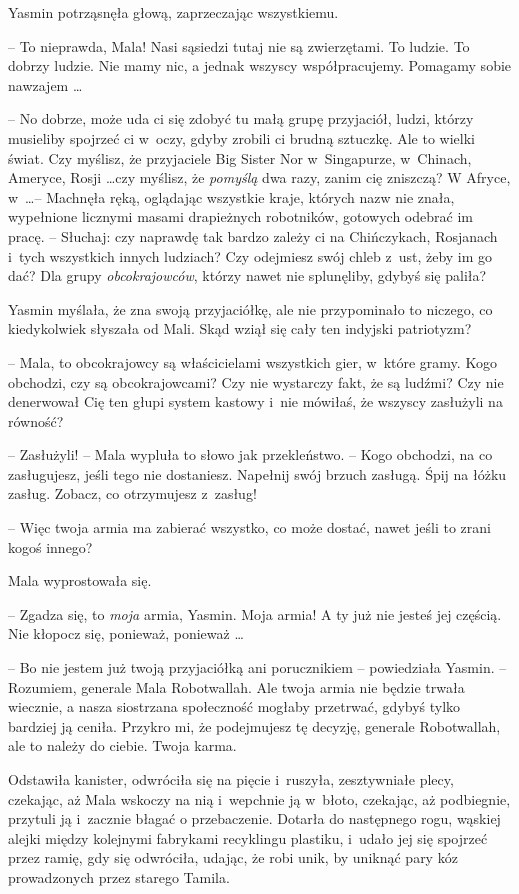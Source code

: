 \documentclass[oneside,polish,11pt,rmheadings]{mwbk}
\begin{document}
Yasmin potrząsnęła głową, zaprzeczając wszystkiemu. 

-- To nieprawda, Mala! Nasi sąsiedzi tutaj nie są zwierzętami. To ludzie. To dobrzy ludzie. Nie mamy nic, a jednak wszyscy współpracujemy. Pomagamy sobie nawzajem \ldots 

 -- No dobrze, może uda ci się zdobyć tu małą grupę przyjaciół, ludzi, którzy musieliby spojrzeć ci w~oczy, gdyby zrobili ci brudną sztuczkę. Ale to wielki świat. Czy myślisz, że przyjaciele Big Sister Nor w~Singapurze, w~Chinach, Ameryce, Rosji \ldots  czy myślisz, że \textit{pomyślą }dwa razy, zanim cię zniszczą? W Afryce, w~\ldots  -- Machnęła ręką, oglądając wszystkie kraje, których nazw nie znała, wypełnione licznymi masami drapieżnych robotników, gotowych odebrać im pracę. -- Słuchaj: czy naprawdę tak bardzo zależy ci na Chińczykach, Rosjanach i~tych wszystkich innych ludziach? Czy odejmiesz swój chleb z~ust, żeby im go dać? Dla grupy \textit{obcokrajowców}, którzy nawet nie splunęliby, gdybyś się paliła?

Yasmin myślała, że zna swoją przyjaciółkę, ale nie przypominało to niczego, co kiedykolwiek słyszała od Mali. Skąd wziął się cały ten indyjski patriotyzm? 

-- Mala, to obcokrajowcy są właścicielami wszystkich gier, w~które gramy. Kogo obchodzi, czy są obcokrajowcami? Czy nie wystarczy fakt, że są ludźmi? Czy nie denerwował Cię ten głupi system kastowy i~nie mówiłaś, że wszyscy zasłużyli na równość?

-- Zasłużyli! -- Mala wypluła to słowo jak przekleństwo. -- Kogo obchodzi, na co zasługujesz, jeśli tego nie dostaniesz. Napełnij swój brzuch zasługą. Śpij na łóżku zasług. Zobacz, co otrzymujesz z~zasług!

-- Więc twoja armia ma zabierać wszystko, co może dostać, nawet jeśli to zrani kogoś innego? 

Mala wyprostowała się. 

-- Zgadza się, to \textit{moja }armia, Yasmin. Moja armia! A ty już nie jesteś jej częścią. Nie kłopocz się, ponieważ, ponieważ \ldots 

-- Bo nie jestem już twoją przyjaciółką ani porucznikiem -- powiedziała Yasmin. -- Rozumiem, generale Mala Robotwallah. Ale twoja armia nie będzie trwała wiecznie, a nasza siostrzana społeczność mogłaby przetrwać, gdybyś tylko bardziej ją ceniła. Przykro mi, że podejmujesz tę decyzję, generale Robotwallah, ale to należy do ciebie. Twoja karma. 

Odstawiła kanister, odwróciła się na pięcie i~ruszyła, zesztywniałe plecy, czekając, aż Mala wskoczy na nią i~wepchnie ją w~błoto, czekając, aż podbiegnie, przytuli ją i~zacznie błagać o przebaczenie. Dotarła do następnego rogu, wąskiej alejki między kolejnymi fabrykami recyklingu plastiku, i~udało jej się spojrzeć przez ramię, gdy się odwróciła, udając, że robi unik, by uniknąć pary kóz prowadzonych przez starego Tamila.
\end{document}
